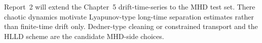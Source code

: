 Report~2 will extend the Chapter~5 drift-time-series to the MHD test set.
There chaotic dynamics motivate Lyapunov-type long-time separation
estimates rather than finite-time drift only. Dedner-type cleaning
\citep{dedner_2002} or constrained transport \citep{evans_hawley_1988}
and the HLLD scheme \citep{miyoshi_kusano_2005} are the candidate
MHD-side choices.
